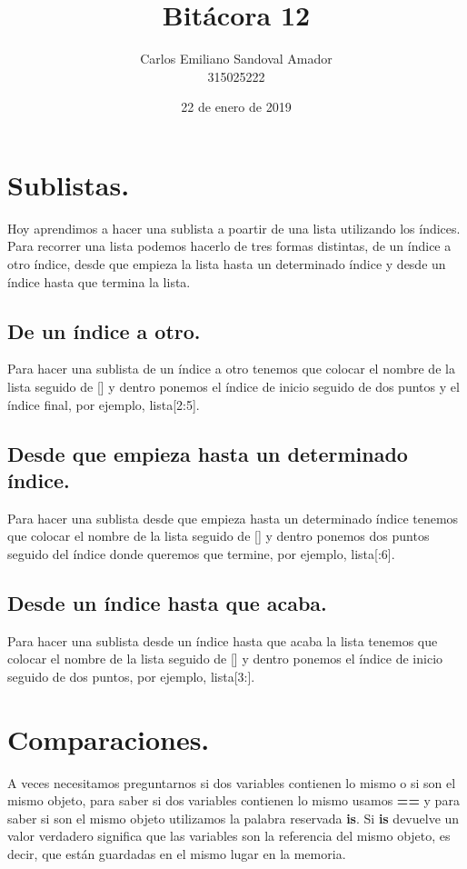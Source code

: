 \documentclass[letterpaper, 12pt, oneside]{article}%
\title{Bitácora 12}
\author{Carlos Emiliano Sandoval Amador \\ 315025222}
\date{22 de enero de 2019}
\begin{document}
	\maketitle %
	\section{Sublistas.} %
	Hoy aprendimos a hacer una sublista a poartir de una lista utilizando los índices. Para recorrer una lista podemos hacerlo de tres formas distintas, de un índice a otro índice, desde que empieza la lista hasta un determinado índice y desde un índice hasta que termina la lista.
	\subsection{De un índice a otro.}
	Para hacer una sublista de un índice a otro tenemos que colocar el nombre de la lista seguido de [] y dentro ponemos el índice de inicio seguido de dos puntos y el índice final, por ejemplo, lista[2:5].
	\subsection{Desde que empieza hasta un determinado índice.}
	Para hacer una sublista desde que empieza hasta un determinado índice tenemos que colocar el nombre de la lista seguido de [] y dentro ponemos dos puntos seguido del índice donde queremos que termine, por ejemplo, lista[:6].
	\subsection{Desde un índice hasta que acaba.}
	Para hacer una sublista desde un índice hasta que acaba la lista tenemos que colocar el nombre de la lista seguido de [] y dentro ponemos el índice de inicio seguido de dos puntos, por ejemplo, lista[3:].
	\section{Comparaciones.}
	A veces necesitamos preguntarnos si dos variables contienen lo mismo o si son el mismo objeto, para saber si dos variables contienen lo mismo usamos \textbf{==} y para saber si son el mismo objeto utilizamos la palabra reservada \textbf{is}. Si \textbf{is} devuelve un valor verdadero significa que las variables son la referencia del mismo objeto, es decir, que están guardadas en el mismo lugar en la memoria.
\end{document}
